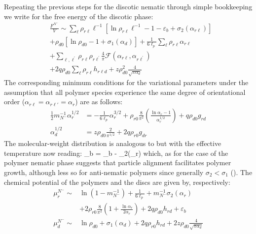 Repeating the previous steps for the discotic nematic through simple bookkeeping we write for the free energy of the discotic phase:
\begin{align}
   & \frac{F^{N^{-}}}{V}  \sim  \sum_{\ell }  \rho_{r \ell} \ell^{-1}  \left [ \ln \rho_{r \ell} \ell^{-1}  -1 - \varepsilon_{b}  +\sigma_{2} (\alpha_{r \ell})  \right ] \nonumber \\
   & + \rho_{d0} [ \ln \rho_{d0} -1 + \sigma_{1}(\alpha_{d})  ] + \frac{1}{6\ell_{p}} \sum_{\ell } \rho_{r \ell} \alpha_{r \ell} \nonumber \\ 
   & + \sum_{\ell,\ell^{\prime}} \rho_{r \ell} \rho_{r \ell^{\prime}} 
    \frac{4}{\pi} {\mathcal F} (\alpha_{r \ell}, \alpha_{r \ell^{\prime}}) \nonumber \\
    & + 2 q \rho_{d0} \sum_{\ell} \rho_{r \ell}  h_{r\ell d} + z \rho_{d0}^{2} \frac{4} {\sqrt{ \pi \alpha_{d}}}
\end{align}
The corresponding minimum conditions for the variational parameters under the assumption that all polymer species experience the same degree of orientational order ($\alpha_{r \ell} = \alpha_{r \ell \prime} = \alpha_{r}$) are as follows: 
\begin{align}
     \frac{1}{2} m_{N^{-}}^{-1}  \alpha_{r }^{1/2} &=  - \frac{1}{6\ell_{p}} \alpha_{r }^{3/2} +  \rho_{r0}  \frac{8}{\pi^{2}} 
    \left ( \frac{\ln  \alpha_{r} - 1}{\alpha_{r}^{1/2}} \right )   + q \rho_{d0}  g_{rd} \nonumber \\
 \alpha_{d}^{1/2} &=  z \rho_{d0} \frac{2}{\pi^{1/2}}  + 2 q \rho_{r0} g_{dr}
 \label{alphamin}
\end{align}
The molecular-weight distribution is  analogous to  but with the effective temperature now reading:
\beq
\tilde{\varepsilon}_{b} = \varepsilon_{b} - \sigma_{2}(\alpha_{r}) 
\label{tempnmin}
\eeq
which, as for the case of the polymer nematic phase suggests that particle alignment facilitates polymer growth, although less so for anti-nematic polymers since generally $\sigma_{2}  < \sigma_{1}$ ().  The chemical potential of the polymers and the discs are given by, respectively:
\begin{align}
 \mu_{r}^{N^{-}}   \sim  
& \ln ( 1 - m_{N^{-}}^{-1}) + \frac{1}{6 \ell_{p}}  +  m_{N^{-}}^{-1} \sigma_{2}(\alpha_{r})  \nonumber \\
& + 2  \rho_{r0} 
\frac{8}{\pi^{2}} \left ( 1+ \frac{\ln \alpha_{r}}{2 \alpha_{r}} \right )
+   2 q \rho_{d0}  h_{rd}
+ \varepsilon_{b} \nonumber \\
 \mu_{d}^{N^{-}}  \sim  & \ln \rho_{d0}  + \sigma_{1}(\alpha_{d})  +   2 q \rho_{r0}  
h_{rd} + 2 z \rho_{d0}  \frac{4} {\sqrt{ \pi \alpha_{d}}}
\end{align}
